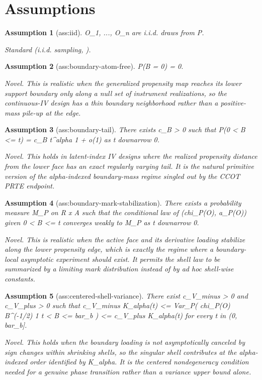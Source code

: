 \documentclass{article}
\newtheorem{assumption}{Assumption}
\begin{document}
\section{Assumptions}

\begin{assumption}[ass:iid]\label{ass:iid}
O_1, ..., O_n are i.i.d. draws from P.
\par\smallskip\noindent\emph{Standard} (i.i.d. sampling, \cite{TanBlanchetSyrgkanis2026PRTEOT}).
\end{assumption}

\begin{assumption}[ass:boundary-atom-free]\label{ass:boundary-atom-free}
P(B = 0) = 0.
\par\smallskip\noindent\emph{Novel.} This is realistic when the generalized propensity map reaches its lower support boundary only along a null set of instrument realizations, so the continuous-IV design has a thin boundary neighborhood rather than a positive-mass pile-up at the edge.
\end{assumption}

\begin{assumption}[ass:boundary-tail]\label{ass:boundary-tail}
There exists c_B > 0 such that P(0 < B <= t) = c_B t^alpha {1 + o(1)} as t downarrow 0.
\par\smallskip\noindent\emph{Novel.} This holds in latent-index IV designs where the realized propensity distance from the lower face has an exact regularly varying tail. It is the natural primitive version of the alpha-indexed boundary-mass regime singled out by the CCOT PRTE endpoint.
\end{assumption}

\begin{assumption}[ass:boundary-mark-stabilization]\label{ass:boundary-mark-stabilization}
There exists a probability measure M_P on R x A such that the conditional law of (chi_P(O), a_P(O)) given 0 < B <= t converges weakly to M_P as t downarrow 0.
\par\smallskip\noindent\emph{Novel.} This is realistic when the active face and its derivative loading stabilize along the lower propensity edge, which is exactly the regime where a boundary-local asymptotic experiment should exist. It permits the shell law to be summarized by a limiting mark distribution instead of by ad hoc shell-wise constants.
\end{assumption}

\begin{assumption}[ass:centered-shell-variance]\label{ass:centered-shell-variance}
There exist c_V_minus > 0 and c_V_plus > 0 such that c_V_minus K_alpha(t) <= Var_P( chi_P(O) B^(-1/2) 1{ t < B <= bar_b } ) <= c_V_plus K_alpha(t) for every t in (0, bar_b].
\par\smallskip\noindent\emph{Novel.} This holds when the boundary loading is not asymptotically canceled by sign changes within shrinking shells, so the singular shell contributes at the alpha-indexed order identified by K_alpha. It is the centered nondegeneracy condition needed for a genuine phase transition rather than a variance upper bound alone.
\end{assumption}
\end{document}
